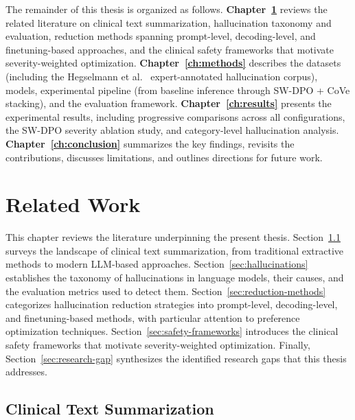 \documentclass[12pt,a4paper,oneside]{report}
\begin{document}
The remainder of this thesis is organized as follows. \textbf{Chapter~\ref{ch:related-work}} reviews the related literature on clinical text summarization, hallucination taxonomy and evaluation, reduction methods spanning prompt-level, decoding-level, and finetuning-based approaches, and the clinical safety frameworks that motivate severity-weighted optimization. \textbf{Chapter~\ref{ch:methods}} describes the datasets (including the Hegselmann et al.~\cite{hegselmann2024datacentric} expert-annotated hallucination corpus), models, experimental pipeline (from baseline inference through SW-DPO + CoVe stacking), and the evaluation framework. \textbf{Chapter~\ref{ch:results}} presents the experimental results, including progressive comparisons across all configurations, the SW-DPO severity ablation study, and category-level hallucination analysis. \textbf{Chapter~\ref{ch:conclusion}} summarizes the key findings, revisits the contributions, discusses limitations, and outlines directions for future work.


\chapter{Related Work}
\label{ch:related-work}

This chapter reviews the literature underpinning the present thesis. Section~\ref{sec:clinical-summarization} surveys the landscape of clinical text summarization, from traditional extractive methods to modern LLM-based approaches. Section~\ref{sec:hallucinations} establishes the taxonomy of hallucinations in language models, their causes, and the evaluation metrics used to detect them. Section~\ref{sec:reduction-methods} categorizes hallucination reduction strategies into prompt-level, decoding-level, and finetuning-based methods, with particular attention to preference optimization techniques. Section~\ref{sec:safety-frameworks} introduces the clinical safety frameworks that motivate severity-weighted optimization. Finally, Section~\ref{sec:research-gap} synthesizes the identified research gaps that this thesis addresses.

\section{Clinical Text Summarization}
\label{sec:clinical-summarization}
\end{document}
